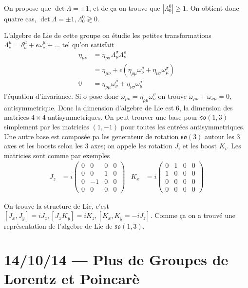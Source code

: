\documentclass[10pt]{report}
\newcommand{\abs}[1]{\left|#1\right|}
\begin{document}
On propose que $\det \Lambda = \pm 1$, et de \c{c}a on trouve que $\abs{\Lambda_0^0} \geq 1$. On obtient donc quatre cas, $\det \Lambda = \pm 1, \Lambda_0^0 \gtrless 0$.

L'algebre de Lie de cette groupe on \'etudie les petites transformations $\Lambda_\nu^\mu = \delta_\nu^\mu + \epsilon \omega_\nu^\mu +\dots$ tel qu'on satisfait
\begin{align}
    \eta_{\mu \nu} &= \eta_{\rho\sigma}\Lambda_\mu^\sigma\Lambda_\nu^\rho\\
    &= \eta_{\mu \nu} + \epsilon\left( \eta_{\rho\mu}\omega_{\nu}^\rho + \eta_{\nu\sigma}\omega_\mu^\sigma \right)\\
    0 &= \eta_{\rho\mu}\omega_{\nu}^\rho + \eta_{\nu\sigma}\omega_\mu^\sigma
\end{align}
l'\'equation d'invariance. Si o pose donc $\omega_{\mu\nu} = \eta_{\rho\mu}\omega_{\nu}^\rho$ on trouve $\omega_{\mu\nu} + \omega_{\nu\mu} = 0$, antisymmetrique. Donc la dimension d'algebre de Lie est $6$, la dimension des matrices $4 \times 4$ antisymmetriques. On peut trouver une base pour $\mathfrak{so}(1,3)$ simplement par les matricies $(1,-1)$ pour toutes les entr\'ees antisymmetriques. Une autre base est compos\'ee pa les generateur de rotation $\mathfrak{so}(3)$ autour les $3$ axes et les boosts selon les $3$ axes; on appele les rotation $J_i$ et les boost $K_i$. Les matricies sont comme par exemples
\begin{align}
    J_z &= i\begin{pmatrix} 0 & 0 & 0 & 0\\0 & 0 & 1 & 0\\0 & -1 & 0 & 0\\0 & 0 & 0 & 0 \end{pmatrix} &K_x &= i\begin{pmatrix} 0 & 1 & 0 & 0\\1 & 0 & 0 & 0\\0 & 0 & 0 & 0\\0 & 0 & 0 & 0 \end{pmatrix} 
\end{align}

On trouve la structure de Lie, c'est $\left[ J_x, J_y \right] = iJ_z, \left[ J_x K_y \right] = iK_z, \left[ K_x, K_y = -iJ_z \right]$. Comme \c{c}a on a trouv\'e une repr\'esentation de l'algebre de Lie de $\mathfrak{so}(1,3)$.

\chapter{14/10/14 --- Plus de Groupes de Lorentz et Poincar\`e}
\end{document}

